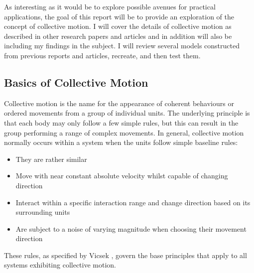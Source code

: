 \documentclass[%
11pt,
amsmath, amssymb,
aps,
pra
]{revtex4-2}
\begin{document}
As interesting as it would be to explore possible avenues for practical applications, the goal of this report will be
to provide an exploration of the concept of collective motion.
 I will cover the details of collective motion
as described in other research papers and articles and in addition will also be including my findings in the subject.
I will review several models constructed from previous reports and articles, recreate, and then test them. 

\subsection{Basics of Collective Motion}

Collective motion is the name for the appearance of coherent behaviours or ordered movements from a group of individual units. 
The underlying principle is that each body may only follow a few simple rules, but this can result in the group performing
a range of complex movements. In general, collective motion normally occurs within a system when the units follow 
simple baseline rules: 
\begin{itemize}
    \item They are rather similar
    \item Move with near constant absolute velocity whilst capable of changing direction
    \item Interact within a specific interaction range and change direction based on its surrounding units
    \item Are subject to a noise of varying magnitude when choosing their movement direction
\end{itemize}
These rules, as specified by Vicsek \cite{vicsek2012collective}, govern the base principles that apply to all 
systems exhibiting collective motion. 
\end{document}
